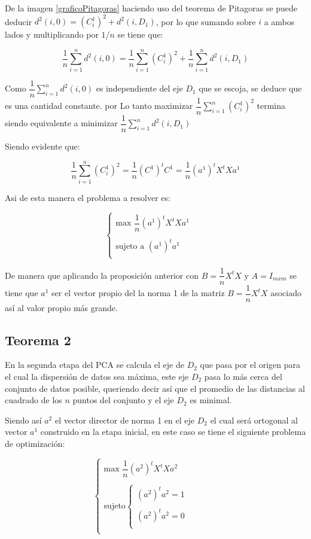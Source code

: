 De la imagen \ref{graficoPitagoras} haciendo uso del teorema de 
Pitagoras se puede deducir $d^2(i,0)=(C_{i}^{1})^2+d^2(i,D_1)$, por lo que sumando sobre $i$ a ambos lados y multiplicando por $1/n$ se tiene que:

$$\dfrac{1}{n} \sum_{i=1}^{n}d^2(i,0)=\dfrac{1}{n}\sum_{i=1}^{n}(C_{i}^{1})^2+\dfrac{1}{n} \sum_{i=1}^{n}d^2(i,D_1)$$

Como $\dfrac{1}{n} \sum_{i=1}^{n}d^2(i,0)$ es independiente del eje $D_1$ que se escoja, se deduce que es una cantidad constante. por Lo tanto maximizar $\dfrac{1}{n}\sum_{i=1}^{n}(C_{i}^{1})^2$ termina siendo equivalente a minimizar $\dfrac{1}{n} \sum_{i=1}^{n}d^2(i,D_1)$

Siendo evidente que:

$$\dfrac{1}{n}\sum_{i=1}^{n}(C_{i}^{1})^2=\dfrac{1}{n}(C^1)^tC^1=\dfrac{1}{n}(a^1)^tX^tXa^1$$

Asi de esta manera el problema a resolver es:

\[\left\{ \begin{array}{rcl}
\mbox{max } \dfrac{1}{n} (a^1)^tX^tXa^1 \\
& & \\
\mbox{sujeto a } (a^1)^ta^1 \\
\end{array}
\right. \]

De manera que aplicando la proposición anterior con $B=\dfrac{1}{n}X^tX$ y $A=I_{mxm}$ se tiene que $a^1$ ser el vector propio del la norma 1 de la matriz $B=\dfrac{1}{n}X^tX$ asociado así al valor propio más grande.

\subsection{Teorema 2}

En la segunda etapa del PCA se calcula el eje de $D_2$ que pasa por el origen para el cual la dispersión de datos sea máxima, este eje $D_2$ pasa lo más cerca del conjunto de datos posible, queriendo decir así que el promedio de las distancias al cuadrado de los $n$ puntos del conjunto y el eje $D_2$ es minimal.

Siendo así $a^2$ el vector director de norma 1 en el eje $D_2$ el cual será ortogonal al vector $a^1$ construido en la etapa inicial, en este caso se tiene el siguiente problema de optimización:


\[\left\{ \begin{array}{rcl}
\mbox{max  } \dfrac{1}{n} (a^2)^tX^tXa^2 \\
& & \\
\mbox{sujeto}\left\{ \begin{array}{rcl}
(a^2)^ta^2=1 \\
& & \\
(a^2)^ta^2=0 \\
\end{array}
\right.  \\
\end{array}
\right. \]

